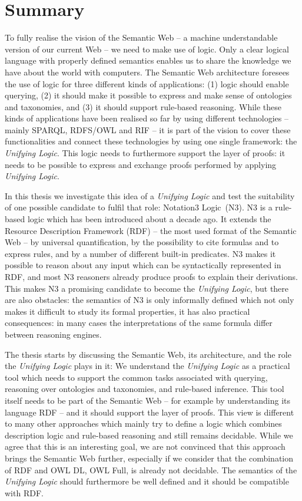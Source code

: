 \chapter{Summary}
\setlength{\epigraphrule}{0pt}
\setlength{\epigraphwidth}{0.48\textwidth}

To fully realise the vision of the Semantic Web -- a machine understandable version of our current Web -- we need to make use of logic. 
Only a clear logical language with properly defined semantics enables us to share the knowledge we have about the world with computers.
The Semantic Web architecture foresees the use of logic for three different kinds of applications: (1) logic should enable querying,
(2) it should make it possible to express and make sense of ontologies and taxonomies, and (3) it should support rule-based reasoning. 
While these kinds of applications have been realised so far by using different technologies -- mainly SPARQL, RDFS/OWL and RIF --
it is part of the vision to cover these functionalities and connect these technologies by using one single framework: the \emph{Unifying Logic}. 
This logic needs to furthermore support the layer of proofs: it needs to be possible to express and exchange proofs performed by applying \emph{Unifying Logic}.

In this thesis we investigate this idea of a \emph{Unifying Logic} and test the suitability of one possible candidate to fulfil that role: Notation3 Logic~(N3).
N3 is a rule-based logic which has been introduced about a decade ago. It extends the Resource Description Framework (RDF) -- the most used format of the Semantic Web -- 
by universal quantification, by the possibility to cite formulas and to express rules, and by a number of different built-in predicates.
N3 makes it possible to reason about any input which can be syntactically represented in RDF, and most N3 reasoners already produce proofs to explain their 
derivations. This makes N3 a promising candidate to become the \emph{Unifying Logic}, but there are also obstacles: 
the semantics of N3 is only informally defined which not only 
makes it difficult to study its formal properties,
it has also practical consequences: in many cases the interpretations of the same formula differ between reasoning engines. 

The thesis starts by discussing the Semantic Web, its architecture, and the role the \emph{Unifying Logic} plays in it: 
We understand the \emph{Unifying Logic} 
as a practical tool which needs to support the common tasks associated with querying, reasoning over ontologies and taxonomies, and rule-based inference.
This tool itself needs to be part of the Semantic Web -- for example by understanding its language RDF -- and it should support the layer of proofs.
This view is different to many other approaches which mainly try to define a logic which combines description logic and rule-based reasoning and still remains decidable.
While we agree that this is an interesting goal, we are not convinced that this approach brings the Semantic Web further, especially if we consider that the combination 
of RDF and OWL DL, OWL Full, is already not decidable. The semantics of the \emph{Unifying Logic} should furthermore be well defined and it should be compatible with RDF.

